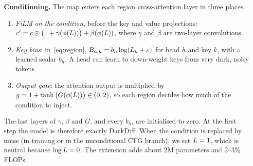 \textbf{Conditioning.}
The map enters each region cross-attention layer in three places.
\begin{enumerate}
  \item \emph{FiLM on the condition}, before the key and value projections:
        $c' = c \odot \big(1 + \gamma(\phi(L))\big) + \beta(\phi(L))$, where $\gamma$ and $\beta$
        are two-layer convolutions.
  \item \emph{Key bias}: in~\eqref{eq:region}, $B_{h,k} = b_h \log(L_k + \varepsilon)$ for
        head $h$ and key $k$, with a learned scalar $b_h$. A head can learn to down-weight keys
        from very dark, noisy tokens.
  \item \emph{Output gate}: the attention output is multiplied by
        $g = 1 + \tanh\big(G(\phi(L))\big) \in (0, 2)$, so each region decides how much of the
        condition to inject.
\end{enumerate}
The last layers of $\gamma$, $\beta$ and $G$, and every $b_h$, are initialised to zero. At the
first step the model is therefore exactly DarkDiff. When the condition is replaced by noise
(in training or in the unconditional CFG branch), we set $L = 1$, which is neutral because
$\log L = 0$. The extension adds about 2M parameters and 2--3\% FLOPs.
